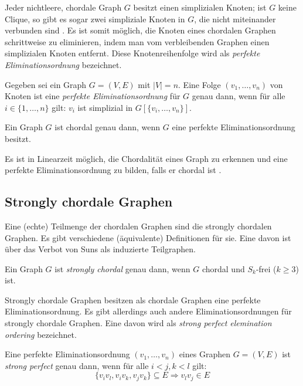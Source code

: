 Jeder nichtleere, chordale Graph $G$ besitzt einen simplizialen Knoten; ist $G$ keine Clique, so gibt es sogar zwei simpliziale Knoten in $G$, die nicht miteinander verbunden sind \cite{Dirac1961}. Es ist somit möglich, die Knoten eines chordalen Graphen schrittweise zu eliminieren, indem man vom verbleibenden Graphen einen simplizialen Knoten entfernt. Diese Knotenreihenfolge wird als \emph{perfekte Eliminationsordnung} bezeichnet.

\begin{mydef}
    Gegeben sei ein Graph $G=(V,E)$ mit $|V|=n$. Eine Folge $(v_1,\ldots,v_n)$ von Knoten ist eine \emph{perfekte Eliminationsordnung} für $G$ genau dann, wenn für alle $i\in\{1,\ldots,n\}$ gilt: $v_i$ ist simplizial in $G[\{v_i,\ldots,v_n\}]$.
\end{mydef}

\begin{Theorem}\cite{Dirac1961}
    Ein Graph $G$ ist chordal genau dann, wenn $G$ eine perfekte Eliminationsordnung besitzt.
\end{Theorem}

Es ist in Linearzeit möglich, die Chordalität eines Graph zu erkennen und eine perfekte Eliminationsordnung zu bilden, falls er chordal ist \cite{Rose1976}.

\subsection{Strongly chordale Graphen}
Eine (echte) Teilmenge der chordalen Graphen sind die strongly chordalen Graphen. Es gibt verschiedene (äquivalente) Definitionen für sie. Eine davon ist über das Verbot von Suns als induzierte Teilgraphen.

\begin{mydef}
    Ein Graph $G$ ist \emph{strongly chordal} genau dann, wenn $G$ chordal und $S_k$-frei ($k\geq 3$) ist.
\end{mydef}

Strongly chordale Graphen besitzen als chordale Graphen eine perfekte Eliminationsordnung. Es gibt allerdings auch andere Eliminationsordnungen für strongly chordale Graphen. Eine davon wird als \emph{strong perfect elemination ordering} bezeichnet.

\begin{mydef}\label{def:strongPerfectEO}
    Eine perfekte Eliminationsordnung $(v_1,\ldots,v_n)$ eines Graphen $G=(V,E)$ ist \emph{strong perfect} genau dann, wenn für alle $i<j,k<l$ gilt:
    \[ \{v_iv_l, v_iv_k, v_jv_k \} \subseteq E \Rightarrow v_lv_j \in E \]
\end{mydef}

